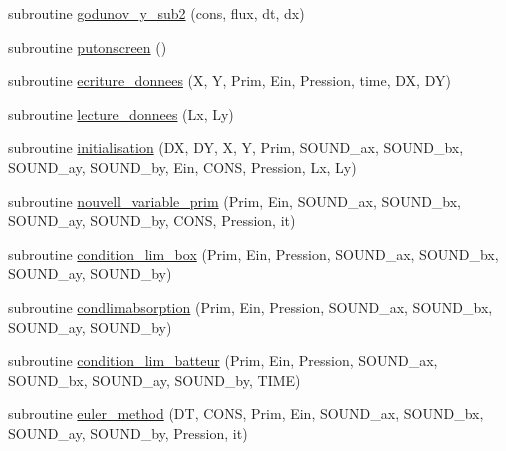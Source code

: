\begin{DoxyCompactItemize}
\item 
subroutine \mbox{\hyperlink{main2Dv1_8f90_af2bc178b3e046a285b7e624ecb7246b8}{godunov\+\_\+y\+\_\+sub2}} (cons, flux, dt, dx)
\item 
subroutine \mbox{\hyperlink{main2Dv1_8f90_a8a5b072c001df1496416cc96562c9916}{putonscreen}} ()
\item 
subroutine \mbox{\hyperlink{main2Dv1_8f90_ab888aad3d30c4051f2c622bac7a2a934}{ecriture\+\_\+donnees}} (X, Y, Prim, Ein, Pression, time, DX, DY)
\item 
subroutine \mbox{\hyperlink{main2Dv1_8f90_a7e06ba833aef7743b6a2f1be79f4bc2e}{lecture\+\_\+donnees}} (Lx, Ly)
\item 
subroutine \mbox{\hyperlink{main2Dv1_8f90_a5305b00a3d0d3ea8f4a992aa2547b701}{initialisation}} (DX, DY, X, Y, Prim, S\+O\+U\+N\+D\+\_\+ax, S\+O\+U\+N\+D\+\_\+bx, S\+O\+U\+N\+D\+\_\+ay, S\+O\+U\+N\+D\+\_\+by, Ein, C\+O\+NS, Pression, Lx, Ly)
\item 
subroutine \mbox{\hyperlink{main2Dv1_8f90_a7e8756401e9774b000709214edc41a76}{nouvell\+\_\+variable\+\_\+prim}} (Prim, Ein, S\+O\+U\+N\+D\+\_\+ax, S\+O\+U\+N\+D\+\_\+bx, S\+O\+U\+N\+D\+\_\+ay, S\+O\+U\+N\+D\+\_\+by, C\+O\+NS, Pression, it)
\item 
subroutine \mbox{\hyperlink{main2Dv1_8f90_a2e4131a2a733710c33c03656b6a7fb34}{condition\+\_\+lim\+\_\+box}} (Prim, Ein, Pression, S\+O\+U\+N\+D\+\_\+ax, S\+O\+U\+N\+D\+\_\+bx, S\+O\+U\+N\+D\+\_\+ay, S\+O\+U\+N\+D\+\_\+by)
\item 
subroutine \mbox{\hyperlink{main2Dv1_8f90_a4fa8d6d2b6084471f67e67e44694e3a7}{condlimabsorption}} (Prim, Ein, Pression, S\+O\+U\+N\+D\+\_\+ax, S\+O\+U\+N\+D\+\_\+bx, S\+O\+U\+N\+D\+\_\+ay, S\+O\+U\+N\+D\+\_\+by)
\item 
subroutine \mbox{\hyperlink{main2Dv1_8f90_ae64974281df2d6f2222187665fd79e38}{condition\+\_\+lim\+\_\+batteur}} (Prim, Ein, Pression, S\+O\+U\+N\+D\+\_\+ax, S\+O\+U\+N\+D\+\_\+bx, S\+O\+U\+N\+D\+\_\+ay, S\+O\+U\+N\+D\+\_\+by, T\+I\+ME)
\item 
subroutine \mbox{\hyperlink{main2Dv1_8f90_ae744869b9c4a59dc194f1d9d7dfcb3f1}{euler\+\_\+method}} (DT, C\+O\+NS, Prim, Ein, S\+O\+U\+N\+D\+\_\+ax, S\+O\+U\+N\+D\+\_\+bx, S\+O\+U\+N\+D\+\_\+ay, S\+O\+U\+N\+D\+\_\+by, Pression, it)
\end{DoxyCompactItemize}
